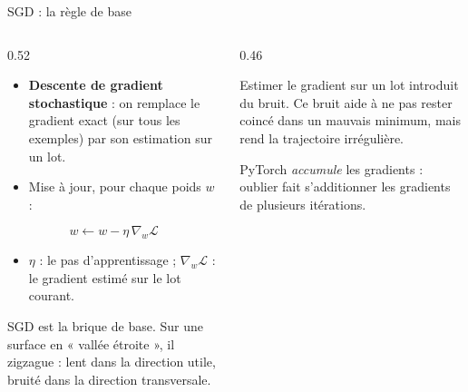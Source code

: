 \begin{frame}{SGD : la règle de base}
\begin{columns}[t]
\begin{column}{0.52\textwidth}
\begin{itemize}
  \item \textbf{Descente de gradient stochastique} : on remplace le gradient
  exact (sur tous les exemples) par son estimation sur un lot.
  \item Mise à jour, pour chaque poids $w$ :
\end{itemize}
\[
w \leftarrow w - \eta \, \nabla_w \mathcal{L}
\]
\begin{itemize}
  \item $\eta$ : le pas d'apprentissage ; $\nabla_w \mathcal{L}$ : le gradient
  estimé sur le lot courant.
\end{itemize}
\begin{kbox}
SGD est la brique de base. Sur une surface en « vallée étroite », il zigzague :
lent dans la direction utile, bruité dans la direction transversale.
\end{kbox}
\end{column}
\begin{column}{0.46\textwidth}
\begin{ebox}
Estimer le gradient sur un lot introduit du bruit. Ce bruit aide à ne pas
rester coincé dans un mauvais minimum, mais rend la trajectoire irrégulière.
\end{ebox}
\begin{wbox}
PyTorch \emph{accumule} les gradients : oublier 
fait s'additionner les gradients de plusieurs itérations.
\end{wbox}
\end{column}
\end{columns}
\end{frame}

